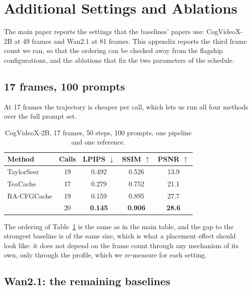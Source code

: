 \section{Additional Settings and Ablations}
\label{app:settings}

The main paper reports the settings that the baselines' papers use: CogVideoX-2B at 49 frames and Wan2.1 at 81 frames. This appendix reports the third frame count we ran, so that the ordering can be checked away from the flagship configurations, and the ablations that fix the two parameters of the schedule.

\subsection{17 frames, 100 prompts}
\label{app:cog17}

At 17 frames the trajectory is cheaper per call, which lets us run all four methods over the full prompt set.

\begin{table}[h]
\centering\footnotesize\setlength{\tabcolsep}{4pt}
\begin{tabular}{lcccc}
\toprule
Method & Calls & LPIPS $\downarrow$ & SSIM $\uparrow$ & PSNR $\uparrow$ \\
\midrule
TaylorSeer & 19 & 0.492 & 0.526 & 13.9 \\
TeaCache & 17 & 0.279 & 0.752 & 21.1 \\
RA-CFGCache & 19 & 0.159 & 0.895 & 27.7 \\
\method{} & 20 & \textbf{0.145} & \textbf{0.906} & \textbf{28.6} \\
\bottomrule
\end{tabular}
\caption{CogVideoX-2B, 17 frames, 50 steps, 100 prompts, one pipeline and one reference.}
\label{tab:cog17}
\end{table}

The ordering of Table~\ref{tab:cog17} is the same as in the main table, and the gap to the strongest baseline is of the same size, which is what a placement effect should look like: it does not depend on the frame count through any mechanism of its own, only through the profile, which we re-measure for each setting.

\subsection{Wan2.1: the remaining baselines}
\label{app:wanfull}

